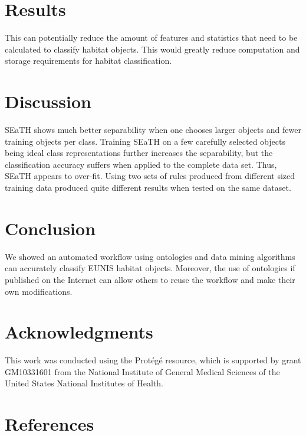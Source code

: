 \documentclass[authoryear, review,12pt,number]{elsarticle}
\begin{document}
\section{Results} This can potentially reduce the amount of features and
statistics that need to be calculated to classify habitat objects. This would
greatly reduce computation and storage requirements for habitat classification.
\section{Discussion} SEaTH shows much better separability when one chooses
larger objects and fewer training objects per class. Training SEaTH on a few
carefully selected objects being ideal class representations further increases
the separability, but the classification accuracy suffers when applied to the
complete data set. Thus, SEaTH appears to over-fit. Using two sets of rules
produced from different sized training data produced quite different results
when tested on the same dataset.  \section{Conclusion} We showed an automated
workflow using ontologies and data mining algorithms can accurately classify
EUNIS habitat objects. Moreover, the use of ontologies if published on the
Internet can allow others to reuse the workflow and make their own
modifications.  \section{Acknowledgments}
This work was conducted using the Prot\'eg\'e resource, which is supported by
grant GM10331601 from the National Institute of General Medical Sciences of the
United States National Institutes of Health.  
\section{References}  
\end{document}
